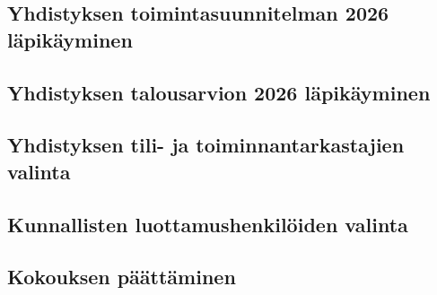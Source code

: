 \documentclass[a4paper,12pt]{article}
\begin{document}
\subsection{Yhdistyksen toimintasuunnitelman 2026 läpikäyminen}
\subsection{Yhdistyksen talousarvion 2026 läpikäyminen}
\subsection{Yhdistyksen tili- ja toiminnantarkastajien valinta}
\subsection{Kunnallisten luottamushenkilöiden valinta}
\subsection{Kokouksen päättäminen}
\end{document}
